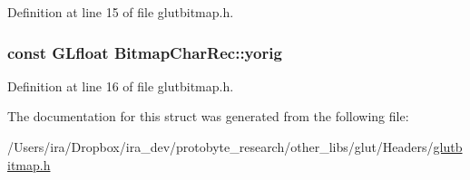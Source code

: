 Definition at line 15 of file glutbitmap.\-h.

\hypertarget{struct_bitmap_char_rec_a7351bb7d319ab8e79da4e16e6aacddaf}{
\subsubsection[{yorig}]{\setlength{\rightskip}{0pt plus 5cm}const {\bf G\-Lfloat} Bitmap\-Char\-Rec\-::yorig}}\label{struct_bitmap_char_rec_a7351bb7d319ab8e79da4e16e6aacddaf}


Definition at line 16 of file glutbitmap.\-h.



The documentation for this struct was generated from the following file\-:\begin{DoxyCompactItemize}
\item 
/\-Users/ira/\-Dropbox/ira\-\_\-dev/protobyte\-\_\-research/other\-\_\-libs/glut/\-Headers/\hyperlink{glutbitmap_8h}{glutbitmap.\-h}\end{DoxyCompactItemize}
